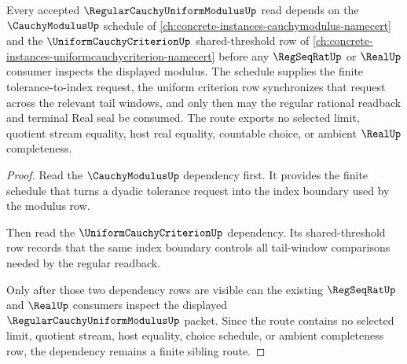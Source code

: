 \begin{theorem}
\label{thm:regular-cauchy-uniform-modulus-cauchy-criterion-route}
Every accepted $\RegularCauchyUniformModulusUp$ read depends on the $\CauchyModulusUp$ schedule of \autoref{ch:concrete-instances-cauchymodulus-namecert} and the $\UniformCauchyCriterionUp$ shared-threshold row of \autoref{ch:concrete-instances-uniformcauchycriterion-namecert} before any $\RegSeqRatUp$ or $\RealUp$ consumer inspects the displayed modulus. The schedule supplies the finite tolerance-to-index request, the uniform criterion row synchronizes that request across the relevant tail windows, and only then may the regular rational readback and terminal Real seal be consumed. The route exports no selected limit, quotient stream equality, host real equality, countable choice, or ambient $\RealUp$ completeness.
\end{theorem}
\begin{proof}
Read the $\CauchyModulusUp$ dependency first. It provides the finite schedule that turns a dyadic tolerance request into the index boundary used by the modulus row.

Then read the $\UniformCauchyCriterionUp$ dependency. Its shared-threshold row records that the same index boundary controls all tail-window comparisons needed by the regular readback.

Only after those two dependency rows are visible can the existing $\RegSeqRatUp$ and $\RealUp$ consumers inspect the displayed $\RegularCauchyUniformModulusUp$ packet. Since the route contains no selected limit, quotient stream, host equality, choice schedule, or ambient completeness row, the dependency remains a finite sibling route.
\end{proof}
